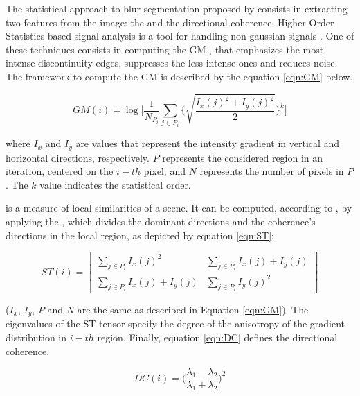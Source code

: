 The statistical approach to blur segmentation proposed by  consists
in extracting two features from the image: the  and the directional coherence. Higher Order Statistics based signal analysis is a tool for handling non-gaussian signals \cite{mitra2000nonlinear}. One of these techniques consists in computing the GM \cite{lee2014blurred}, that emphasizes the most intense discontinuity edges, suppresses the less intense ones and reduces noise. The framework to compute the GM is described by the equation \ref{eqn:GM} below.

\begin{equation}
\label{eqn:GM}
GM(i) = \log 
    \Bigg[
        \frac{1}{N_{P_i}}
            \sum_{j \in P_i} 
            \Bigg\{\sqrt{ \frac{I_x(j)^2 + I_y(j)^2}{2}} \Bigg\}^k
    \Bigg]
\end{equation}

\noindent where $I_x$ and $I_y$ are values that represent the intensity gradient in vertical and horizontal directions, respectively. $P$ represents the considered region in an iteration, centered on the $i-th$ pixel, and $N$ represents the number of pixels in $P$. The $k$ value indicates the statistical order.

 is a measure of local similarities of a scene. It can be computed, according to , by applying the , which divides the dominant directions and the coherence's directions in the local region, as depicted by equation \ref{eqn:ST}:

\begin{equation}
\label{eqn:ST}
ST(i) =
    \begin{bmatrix}
        \sum_{j \in P_i}I_x(j)^2  & \sum_{j \in P_i}I_x(j) + I_y(j) \\
        \sum_{j \in P_i}I_x(j) + I_y(j) & \sum_{j \in P_i}I_y(j)^2 
    \end{bmatrix}
\end{equation}

\noindent ($I_x$, $I_y$, $P$ and $N$ are the same as described in Equation \ref{eqn:GM}). The eigenvalues of the ST tensor specify the degree of the anisotropy of the gradient distribution in $i-th$ region. Finally, equation \ref{eqn:DC} defines the directional coherence.

\begin{equation}
\label{eqn:DC}
DC(i) =
    \Bigg(
        \frac{\lambda_1 - \lambda_2}{\lambda_1 + \lambda_2}
    \Bigg)^2
\end{equation}

